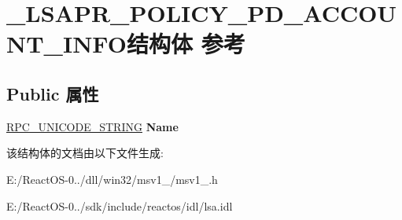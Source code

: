 \hypertarget{struct___l_s_a_p_r___p_o_l_i_c_y___p_d___a_c_c_o_u_n_t___i_n_f_o}{}\section{\+\_\+\+L\+S\+A\+P\+R\+\_\+\+P\+O\+L\+I\+C\+Y\+\_\+\+P\+D\+\_\+\+A\+C\+C\+O\+U\+N\+T\+\_\+\+I\+N\+F\+O结构体 参考}
\label{struct___l_s_a_p_r___p_o_l_i_c_y___p_d___a_c_c_o_u_n_t___i_n_f_o}
\subsection*{Public 属性}
\begin{DoxyCompactItemize}
\item 
\mbox{\label{struct___l_s_a_p_r___p_o_l_i_c_y___p_d___a_c_c_o_u_n_t___i_n_f_o_a9c306d30e73d068ae2c70aaec5faabf6}} 
\hyperlink{struct___r_p_c___u_n_i_c_o_d_e___s_t_r_i_n_g}{R\+P\+C\+\_\+\+U\+N\+I\+C\+O\+D\+E\+\_\+\+S\+T\+R\+I\+NG} {\bfseries Name}
\end{DoxyCompactItemize}


该结构体的文档由以下文件生成\+:\begin{DoxyCompactItemize}
\item 
E\+:/\+React\+O\+S-\/0../dll/win32/msv1\+\_/msv1\+\_.\+h\item 
E\+:/\+React\+O\+S-\/0../sdk/include/reactos/idl/lsa.\+idl\end{DoxyCompactItemize}

